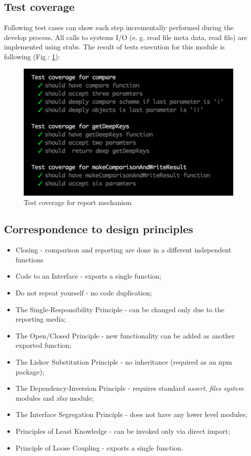 \subsection{Test coverage}
Following test cases can show each step incrementally performed during the develop process. All calls to systems I/O (e. g. read file meta data, read file) are implemented using stubs.
The result of tests execution  for this module is following (Fig.: \ref{fig:testReport}): 
\begin{figure}[H]
	\centering
	\includegraphics[width=\linewidth]{grafiken/testReport.png}
	\caption{Test coverage for report mechanism}
	\label{fig:testReport}
\end{figure}

\subsection{Correspondence to design principles}
\begin{itemize}
	\item Closing - comparison and reporting are done in a different independent functions
	\item Code to an Interface - exports a single function;
	\item Do not repeat yourself - no code duplication;
	\item The Single-Responsibility Principle - can be changed only due to the reporting media;
	\item The Open/Closed Principle - new functionality can be added as another exported function;
	\item The Liskov Substitution Principle - no inheritance (required as an npm package);
	\item The Dependency-Inversion Principle - requires standard \textit{assert}, \textit{files system} modules and \textit{xlsx} module;
	\item The Interface Segregation Principle - does not have any lower level modules;
	\item Principles of Least Knowledge -  can be invoked only via direct import;
	\item Principle of Loose Coupling - exports a single function.
\end{itemize}